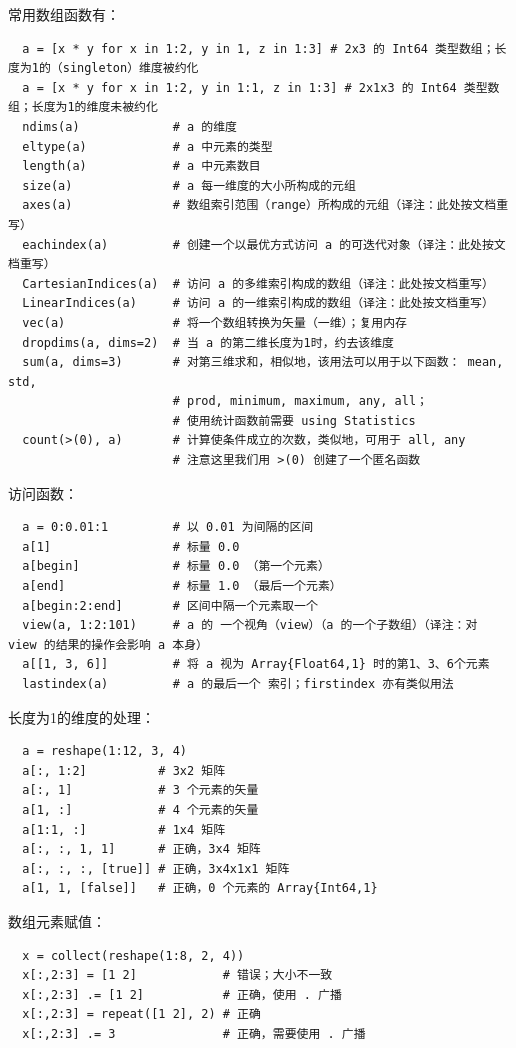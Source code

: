 \documentclass[10pt,a4paper]{article}
\begin{document}
常用数组函数有：
\begin{lstlisting}
  a = [x * y for x in 1:2, y in 1, z in 1:3] # 2x3 的 Int64 类型数组；长度为1的（singleton）维度被约化
  a = [x * y for x in 1:2, y in 1:1, z in 1:3] # 2x1x3 的 Int64 类型数组；长度为1的维度未被约化
  ndims(a)             # a 的维度
  eltype(a)            # a 中元素的类型
  length(a)            # a 中元素数目
  size(a)              # a 每一维度的大小所构成的元组
  axes(a)              # 数组索引范围（range）所构成的元组（译注：此处按文档重写）
  eachindex(a)         # 创建一个以最优方式访问 a 的可迭代对象（译注：此处按文档重写）
  CartesianIndices(a)  # 访问 a 的多维索引构成的数组（译注：此处按文档重写）
  LinearIndices(a)     # 访问 a 的一维索引构成的数组（译注：此处按文档重写）
  vec(a)               # 将一个数组转换为矢量（一维）；复用内存
  dropdims(a, dims=2)  # 当 a 的第二维长度为1时，约去该维度
  sum(a, dims=3)       # 对第三维求和，相似地，该用法可以用于以下函数： mean, std,
                       # prod, minimum, maximum, any, all；
                       # 使用统计函数前需要 using Statistics
  count(>(0), a)       # 计算使条件成立的次数，类似地，可用于 all, any
                       # 注意这里我们用 >(0) 创建了一个匿名函数
\end{lstlisting}

访问函数：
\begin{lstlisting}
  a = 0:0.01:1         # 以 0.01 为间隔的区间
  a[1]                 # 标量 0.0
  a[begin]             # 标量 0.0 （第一个元素）
  a[end]               # 标量 1.0 （最后一个元素）
  a[begin:2:end]       # 区间中隔一个元素取一个
  view(a, 1:2:101)     # a 的 一个视角（view）（a 的一个子数组）（译注：对 view 的结果的操作会影响 a 本身）
  a[[1, 3, 6]]         # 将 a 视为 Array{Float64,1} 时的第1、3、6个元素
  lastindex(a)         # a 的最后一个 索引；firstindex 亦有类似用法 
\end{lstlisting}

长度为1的维度的处理：
\begin{lstlisting}
  a = reshape(1:12, 3, 4)
  a[:, 1:2]          # 3x2 矩阵
  a[:, 1]            # 3 个元素的矢量
  a[1, :]            # 4 个元素的矢量
  a[1:1, :]          # 1x4 矩阵
  a[:, :, 1, 1]      # 正确，3x4 矩阵
  a[:, :, :, [true]] # 正确，3x4x1x1 矩阵
  a[1, 1, [false]]   # 正确，0 个元素的 Array{Int64,1}
\end{lstlisting}

数组元素赋值：
\begin{lstlisting}
  x = collect(reshape(1:8, 2, 4))
  x[:,2:3] = [1 2]            # 错误；大小不一致
  x[:,2:3] .= [1 2]           # 正确，使用 . 广播
  x[:,2:3] = repeat([1 2], 2) # 正确
  x[:,2:3] .= 3               # 正确，需要使用 . 广播
\end{lstlisting}
\end{document}

